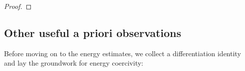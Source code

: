 \documentclass[11pt,leqno,textwidth=10cm]{amsart}
\numberwithin{equation}{section}
\theoremstyle{definition}
\newtheorem{remark}[definition]{Remark}
\theoremstyle{plain}
\newcommand{\1}{\mathbbm{1}}
\newcommand{\Ric}{\text{\normalfont{Ric}}}
\renewcommand{\epsilon}{\varepsilon}
\newcommand{\del}{\partial}
\newcommand{\RE}{\bm{E}}
\begin{document}
\begin{proof}
\end{proof}



\subsection{Other useful a priori observations}\label{subsec:AP-misc}

Before moving on to the energy estimates, we collect a differentiation identity and lay the groundwork for energy coercivity:
\end{document}
